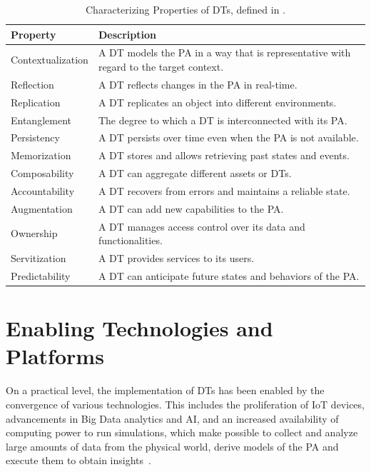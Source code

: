 \begin{table}[ht]
\centering
\caption{Characterizing Properties of \acp{DT}, defined in \cite{dt-IoT-context-Minerva-2020}.}
\renewcommand{\arraystretch}{1.3}
\begin{tabular}{p{3.5cm}|p{\dimexpr\textwidth-4.5cm\relax}}
\toprule
\midrule
\textbf{Property} & \textbf{Description} \\
\midrule
\toprule
{Contextualization} & A \ac{DT} models the \ac{PA} in a way that is representative with regard to the target context. \\
\hline
{Reflection} & A \ac{DT} reflects changes in the \ac{PA} in real-time. \\
\hline
{Replication} & A \ac{DT} replicates an object into different environments. \\
\hline
{Entanglement} & The degree to which a \ac{DT} is interconnected with its \ac{PA}. \\
\hline
{Persistency} & A \ac{DT} persists over time even when the \ac{PA} is not available. \\
\hline
{Memorization} & A \ac{DT} stores and allows retrieving past states and events. \\
\hline
{Composability} & A \ac{DT} can aggregate different assets or \acp{DT}. \\
\hline
{Accountability} & A \ac{DT} recovers from errors and maintains a reliable state.\\
\hline
{Augmentation} & A \ac{DT} can add new capabilities to the \ac{PA}.\\
\hline
{Ownership} & A \ac{DT} manages access control over its data and functionalities.\\
\hline
{Servitization} & A \ac{DT} provides services to its users.\\
\hline
{Predictability} & A \ac{DT} can anticipate future states and behaviors of the \ac{PA}.\\
\midrule
\bottomrule
\end{tabular}%
\label{tab:minerva-properties}
\end{table}



\section{Enabling Technologies and Platforms}

On a practical level, the implementation of \acp{DT} has been enabled by the convergence of various technologies.
%
This includes the proliferation of \ac{IoT} devices, 
advancements in Big Data analytics and \ac{AI}, 
and an increased availability of computing power to run simulations, 
which make possible to collect and analyze large amounts of data from the physical world, 
derive models of the \ac{PA} and execute them to obtain insights~\cite{qi2021enablingtechdt,Fuller_Fan_Day_Barlow_2020,Mihai_survey_enabling_2022}.

